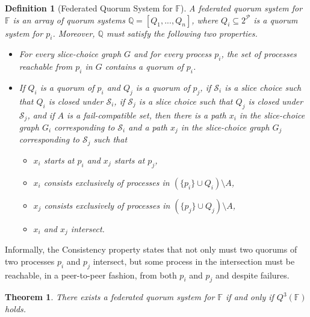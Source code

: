 \documentclass[11pt]{article}
\newtheorem{definition}{Definition}
\newtheorem{thm}{Theorem}
\begin{document}
\begin{definition}[Federated Quorum System for $\mathbb{F}$]
  A federated quorum system for $\mathbb{F}$ is an array of quorum systems $\mathbb{Q}=\left[Q_1,...,Q_n\right]$, where $Q_i\subseteq 2^\mathcal{P}$ is a quorum system for $p_i$. Moreover, $\mathbb{Q}$ must satisfy the following two properties.
  \begin{itemize}
    \item [Availability] For every slice-choice graph $G$ and for every process $p_i$, the set of processes reachable from $p_i$ in $G$ contains a quorum of $p_i$.
    \item[Consistency] If $Q_i$ is a quorum of $p_i$ and $Q_j$ is a quorum of $p_j$, if $\mathcal{S}_i$ is a slice choice such that $Q_i$ is closed under $\mathcal{S}_i$, if $\mathcal{S}_j$ is a slice choice such that $Q_j$ is closed under $\mathcal{S}_j$, and if $A$ is a fail-compatible set, then there is a path $x_i$ in the slice-choice graph $G_i$ corresponding to $\mathcal{S}_i$ and a path $x_j$ in the slice-choice graph $G_j$ corresponding to $\mathcal{S}_j$ such that
      \begin{itemize}
        \item $x_i$ starts at $p_i$ and $x_j$ starts at $p_j$,
        \item $x_i$ consists exclusively of processes in $\left(\{p_i\} \cup Q_i\right)\setminus A$,
        \item $x_j$ consists exclusively of processes in $\left(\{p_j\} \cup Q_j\right)\setminus A$,
        \item $x_i$ and $x_j$ intersect.
      \end{itemize}
  \end{itemize}
\end{definition}

Informally, the Consistency property states that not only must two quorums of two processes $p_i$ and $p_j$ intersect, but some process in the intersection must be reachable, in a peer-to-peer fashion, from both $p_i$ and $p_j$ and despite failures.

\begin{thm}
  \label{thm:existsFQSiff}
  There exists a federated quorum system for $\mathbb{F}$ if and only if $Q^3(\mathbb{F})$ holds.
\end{thm}
\end{document}
